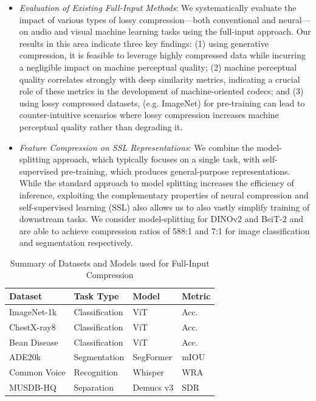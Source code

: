 \documentclass[10pt,twocolumn,letterpaper]{article}
\begin{document}
\begin{itemize}
\item \textit{Evaluation of Existing Full-Input Methods}: We systematically evaluate the impact of various types of lossy compression---both conventional and neural---on audio and visual machine learning tasks using the full-input approach. Our results in this area indicate three key findings: (1) using generative compression, it is feasible to leverage highly compressed data while incurring a negligible impact on machine perceptual quality; (2) machine perceptual quality correlates strongly with deep similarity metrics, indicating a crucial role of these metrics in the development of machine-oriented codecs; and (3) using lossy compressed datasets, (e.g. ImageNet) for pre-training can lead to counter-intuitive scenarios where lossy compression increases machine perceptual quality rather than degrading it.
\item \textit{Feature Compression on SSL Representations}: We combine the model-splitting approach, which typically focuses on a single task, with self-supervised pre-training, which produces general-purpose representations. While the standard approach to model splitting increases the efficiency of inference, exploiting the complementary properties of neural compression and self-supervised learning (SSL) also allows us to also vastly simplify training of downstream tasks. We consider model-splitting for DINOv2 and BeiT-2 and are able to achieve compression ratios of 588:1 and 7:1 for image classification and segmentation respectively.
\end{itemize}
\begin{table}[ht]
\centering
\caption{Summary of Datasets and Models used for Full-Input Compression}
\label{tab:datasets_models}
\begin{tabular}{llll}
\toprule
Dataset & Task Type & Model & Metric \\
\midrule
ImageNet-1k & Classification & ViT &  Acc. \\
ChestX-ray8 & Classification & ViT & Acc. \\
Bean Disease & Classification & ViT & Acc. \\
ADE20k & Segmentation & SegFormer & mIOU \\
Common Voice & Recognition & Whisper & WRA \\
MUSDB-HQ & Separation & Demucs v3 & SDR \\
\bottomrule
\end{tabular}
\end{table}
\end{document}

